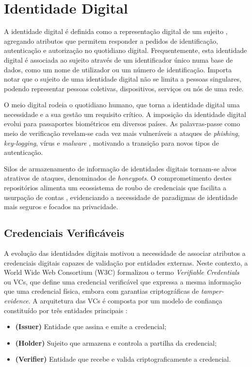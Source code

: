 \section{Identidade Digital}

A identidade digital é definida como a representação digital de um sujeito \cite{sedlmeir2021digital}, agregando atributos que permitem responder a pedidos de identificação, autenticação e autorização no quotidiano digital. Frequentemente, esta identidade digital é associada ao sujeito através de um identificador único numa base de dados, como um nome de utilizador ou um número de identificação. Importa notar que o sujeito de uma identidade digital não se limita a pessoas singulares, podendo representar pessoas coletivas, dispositivos, serviços ou nós de uma rede.

O meio digital rodeia o quotidiano humano, que torna a identidade digital uma necessidade e a sua gestão um requisito crítico. A imposição da identidade digital evolui para passaportes biométricos em diversos países. As palavras-passe como meio de verificação revelam-se cada vez mais vulneráveis a ataques de \textit{phishing}, \textit{key-logging}, vírus e \textit{malware} \cite{herley2009so}, motivando a transição para novos tipos de autenticação.

Silos de armazenamento de informação de identidades digitais tornam-se alvos atrativos de ataques, denominados de \textit{honeypots}. O comprometimento destes repositórios alimenta um ecossistema de roubo de credenciais que facilita a usurpação de contas \cite{thomas2017data}, evidenciando a necessidade de paradigmas de identidade mais seguros e focados na privacidade.

\subsection{Credenciais Verificáveis}

A evolução das identidades digitais motivou a necessidade de associar atributos a credenciais digitais capazes de validação por entidades externas. Neste contexto, a World Wide Web Consortium (W3C) formalizou o termo \textit{Verifiable Credentials} ou VCs, que define uma credencial verificável que expressa a mesma informação que uma credencial física, embora com garantias criptográficas de \textit{tamper-evidence}. A arquitetura das VCs é composta por um modelo de confiança constituído por três entidades principais \cite{w3}:

\begin{itemize}
    \item \textbf{(Issuer)} Entidade que assina e emite a credencial;
    \item \textbf{(Holder)} Sujeito que armazena e controla a partilha da credencial;
    \item \textbf{(Verifier)} Entidade que recebe e valida criptograficamente a credencial.
\end{itemize}

